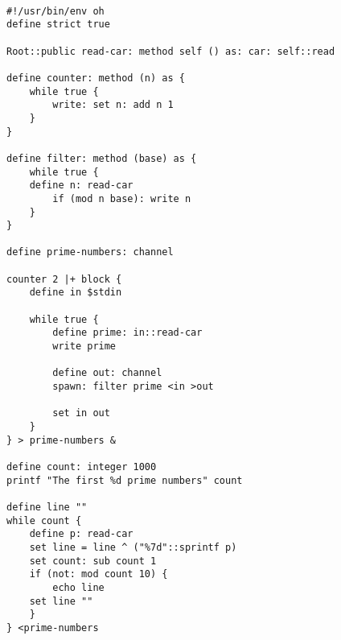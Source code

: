 \documentclass[12pt]{book}
\begin{document}
\begin{lstlisting}

#!/usr/bin/env oh
define strict true

Root::public read-car: method self () as: car: self::read

define counter: method (n) as {
    while true {
        write: set n: add n 1
    }
}

define filter: method (base) as {
    while true {
	define n: read-car
        if (mod n base): write n
    }
}

define prime-numbers: channel

counter 2 |+ block {
    define in $stdin

    while true {
        define prime: in::read-car
        write prime

        define out: channel
        spawn: filter prime <in >out

        set in out
    }
} > prime-numbers &

define count: integer 1000
printf "The first %d prime numbers" count

define line ""
while count {
    define p: read-car
    set line = line ^ ("%7d"::sprintf p)
    set count: sub count 1
    if (not: mod count 10) {
        echo line
	set line ""
    }
} <prime-numbers
\end{lstlisting}




\end{document}
